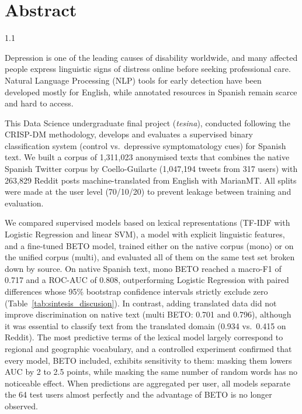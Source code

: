 \documentclass[12pt,a4paper]{article}
\begin{document}
\section*{Abstract}
\begin{spacing}{1.1}

Depression is one of the leading causes of disability worldwide, and many affected people express linguistic signs of distress online before seeking professional care. Natural Language Processing (NLP) tools for early detection have been developed mostly for English, while annotated resources in Spanish remain scarce and hard to access.

This Data Science undergraduate final project (\emph{tesina}), conducted following the CRISP-DM methodology, develops and evaluates a supervised binary classification system (control vs.\ depressive symptomatology cues) for Spanish text. We built a corpus of 1,311,023 anonymised texts that combines the native Spanish Twitter corpus by Coello-Guilarte (1,047,194 tweets from 317 users) with 263,829 Reddit posts machine-translated from English with MarianMT. All splits were made at the user level (70/10/20) to prevent leakage between training and evaluation.

We compared supervised models based on lexical representations (TF-IDF with Logistic Regression and linear SVM), a model with explicit linguistic features, and a fine-tuned BETO model, trained either on the native corpus (mono) or on the unified corpus (multi), and evaluated all of them on the same test set broken down by source. On native Spanish text, mono BETO reached a macro-F1 of 0.717 and a ROC-AUC of 0.808, outperforming Logistic Regression with paired differences whose 95\% bootstrap confidence intervals strictly exclude zero (Table~\ref{tab:sintesis_discusion}). In contrast, adding translated data did not improve discrimination on native text (multi BETO: 0.701 and 0.796), although it was essential to classify text from the translated domain (0.934 vs.\ 0.415 on Reddit). The most predictive terms of the lexical model largely correspond to regional and geographic vocabulary, and a controlled experiment confirmed that every model, BETO included, exhibits sensitivity to them: masking them lowers AUC by 2 to 2.5 points, while masking the same number of random words has no noticeable effect. When predictions are aggregated per user, all models separate the 64 test users almost perfectly and the advantage of BETO is no longer observed.


\end{spacing}
\end{document}
